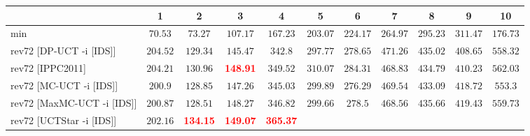 \documentclass{article}
\begin{document}
\begin{tabular}{|l|r@{$\pm$}rr@{$\pm$}rr@{$\pm$}rr@{$\pm$}rr@{$\pm$}rr@{$\pm$}rr@{$\pm$}rr@{$\pm$}rr@{$\pm$}rr@{$\pm$}r|}
\hline

& \multicolumn{2}{c}{1}
& \multicolumn{2}{c}{2}
& \multicolumn{2}{c}{3}
& \multicolumn{2}{c}{4}
& \multicolumn{2}{c}{5}
& \multicolumn{2}{c}{6}
& \multicolumn{2}{c}{7}
& \multicolumn{2}{c}{8}
& \multicolumn{2}{c}{9}
& \multicolumn{2}{c|}{10}
\\
\hline
\hline
min
& \multicolumn{2}{c}{$70.53$}
& \multicolumn{2}{c}{$73.27$}
& \multicolumn{2}{c}{$107.17$}
& \multicolumn{2}{c}{$167.23$}
& \multicolumn{2}{c}{$203.07$}
& \multicolumn{2}{c}{$224.17$}
& \multicolumn{2}{c}{$264.97$}
& \multicolumn{2}{c}{$295.23$}
& \multicolumn{2}{c}{$311.47$}
& \multicolumn{2}{c|}{$176.73$}
\\
rev72 [DP-UCT -i [IDS]]
& \multicolumn{2}{c}{$204.52$}
& \multicolumn{2}{c}{$129.34$}
& \multicolumn{2}{c}{$145.47$}
& \multicolumn{2}{c}{$342.8$}
& \multicolumn{2}{c}{$297.77$}
& \multicolumn{2}{c}{$278.65$}
& \multicolumn{2}{c}{$471.26$}
& \multicolumn{2}{c}{$435.02$}
& \multicolumn{2}{c}{$408.65$}
& \multicolumn{2}{c|}{$558.32$}
\\
rev72 [IPPC2011]
& \multicolumn{2}{c}{$204.21$}
& \multicolumn{2}{c}{$130.96$}
& \multicolumn{2}{c}{\textbf{\textcolor{red}{148.91}}}
& \multicolumn{2}{c}{$349.52$}
& \multicolumn{2}{c}{$310.07$}
& \multicolumn{2}{c}{$284.31$}
& \multicolumn{2}{c}{$468.83$}
& \multicolumn{2}{c}{$434.79$}
& \multicolumn{2}{c}{$410.23$}
& \multicolumn{2}{c|}{$562.03$}
\\
rev72 [MC-UCT -i [IDS]]
& \multicolumn{2}{c}{$200.9$}
& \multicolumn{2}{c}{$128.85$}
& \multicolumn{2}{c}{$147.26$}
& \multicolumn{2}{c}{$345.03$}
& \multicolumn{2}{c}{$299.89$}
& \multicolumn{2}{c}{$276.29$}
& \multicolumn{2}{c}{$469.54$}
& \multicolumn{2}{c}{$433.09$}
& \multicolumn{2}{c}{$418.72$}
& \multicolumn{2}{c|}{$553.3$}
\\
rev72 [MaxMC-UCT -i [IDS]]
& \multicolumn{2}{c}{$200.87$}
& \multicolumn{2}{c}{$128.51$}
& \multicolumn{2}{c}{$148.27$}
& \multicolumn{2}{c}{$346.82$}
& \multicolumn{2}{c}{$299.66$}
& \multicolumn{2}{c}{$278.5$}
& \multicolumn{2}{c}{$468.56$}
& \multicolumn{2}{c}{$435.66$}
& \multicolumn{2}{c}{$419.43$}
& \multicolumn{2}{c|}{$559.73$}
\\
rev72 [UCTStar -i [IDS]]
& \multicolumn{2}{c}{$202.16$}
& \multicolumn{2}{c}{\textbf{\textcolor{red}{134.15}}}
& \multicolumn{2}{c}{\textbf{\textcolor{red}{149.07}}}
& \multicolumn{2}{c}{\textbf{\textcolor{red}{365.37}}}

\end{tabular}
\end{document}
